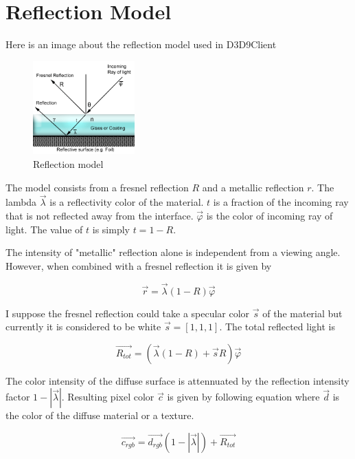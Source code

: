 \documentclass[twocolumn]{report}
\newenvironment{twocol}[0]{%
\begin{list}{}{%
\onecolumn
\setlength{\leftmargin}{0.15cm}%
\setlength{\rightmargin}{0.15cm}%
\setlength{\topmargin}{0cm}%
\setlength{\headheight}{0cm}%
\setlength{\headsep}{0cm}%
\setlength{\textheight}{24cm}%
}%
\item[]}{\end{list}}
\begin{document}
\begin{twocol}

\section*{Reflection Model}

Here is an image about the reflection model used in D3D9Client

\begin{figure}[h]
	\centering
	\includegraphics[width=0.35\textwidth]{images/Fresnel.png}
	\caption{Reflection model}
\end{figure}

The model consists from a fresnel reflection $R$ and a metallic reflection $r$. The lambda $\vec{\lambda}$ is a reflectivity color of the material. $t$ is a fraction of the incoming ray that is not reflected away from the interface. $\vec{\varphi}$ is the color of incoming ray of light. The value of $t$ is simply $t=1-R$.

The intensity of "metallic" reflection alone is independent from a viewing angle. However, when combined with a fresnel reflection it is given by

\begin{equation}
 \vec{r} = \vec{\lambda}(1-R)\vec{\varphi}
\end{equation}

I suppose the fresnel reflection could take a specular color $\vec{s}$ of the material but currently it is considered to be white $\vec{s}=[1,1,1]$. The total reflected light is

\begin{equation}
\vec{R_{tot}} = (\vec{\lambda}(1-R)+\vec{s}R)\vec{\varphi}
\end{equation}

The color intensity of the diffuse surface is attennuated by the reflection intensity factor $1-|\vec{\lambda}|$. Resulting pixel color $\vec{c}$ is given by following equation where $\vec{d}$ is the color of the diffuse material or a texture.

\begin{equation}
\vec{c_{rgb}} = \vec{d_{rgb}}(1-|\vec{\lambda}|) + \vec{R_{tot}}
\end{equation}


\end{twocol}
\end{document}
